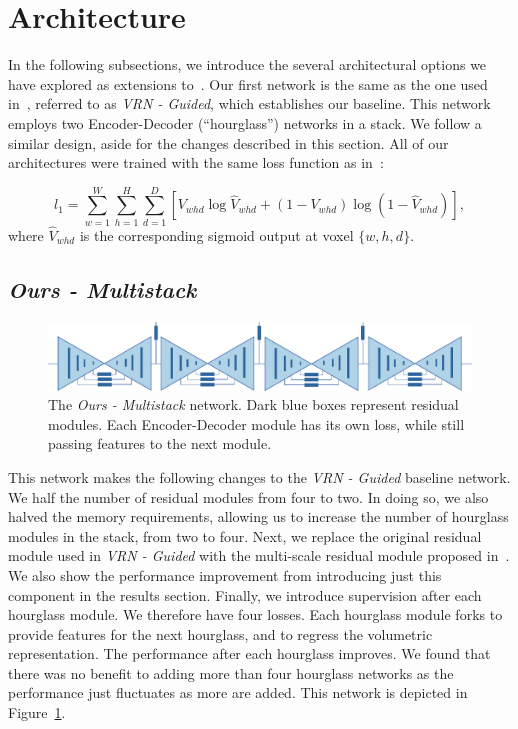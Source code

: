 \section{Architecture}

In the following subsections, we introduce the several architectural
options we have explored as extensions to~\cite{jackson2017vrn}. Our
first network is the same as the one used in~\cite{jackson2017vrn}, referred
to as \textit{VRN - Guided}, which establishes our baseline. This
network employs two Encoder-Decoder (``hourglass'') networks in a
stack. We follow a similar design, aside for the changes described in
this section. All of our architectures were trained with the same loss
function as in~\cite{jackson2017vrn}:

\begin{equation}
  l_{1} = \sum\limits_{w=1}^{W} \sum\limits_{h=1}^{H}\sum\limits_{d=1}^{D}[V_{whd}\log \widehat{V}_{whd}+(1-V_{whd})\log(1-\widehat{V}
_{whd})],
\end{equation}
where $\widehat{V}_{whd}$ is the corresponding sigmoid output at voxel
$\{w,h,d\}$.

\subsection{\textit{Ours - Multistack}}

\begin{figure}
  \includegraphics[width=\linewidth]{img/multistack.pdf}
  \caption{The \textit{Ours - Multistack} network. Dark blue boxes
    represent residual modules. Each Encoder-Decoder module has its
    own loss, while still passing features to the next module.}
  \label{fig:multistack}
\end{figure}


This network makes the following changes to the \textit{VRN - Guided}
baseline network. We half the number of residual modules from four to
two. In doing so, we also halved the memory requirements, allowing us
to increase the number of hourglass modules in the stack, from two to
four. Next, we replace the original residual module used in
\textit{VRN - Guided} with the multi-scale residual module proposed
in~\cite{bulat2017binarized}. We also show the performance improvement
from introducing just this component in the results section. Finally,
we introduce supervision after each hourglass module. We therefore
have four losses. Each hourglass module forks to provide features for
the next hourglass, and to regress the volumetric representation. The
performance after each hourglass improves. We found that there was no
benefit to adding more than four hourglass networks as the performance
just fluctuates as more are added. This network is depicted in
Figure~\ref{fig:multistack}.

